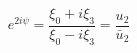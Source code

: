 \begin{equation}
e^{2i \psi} = \frac{\xi_{0} + i \xi_{3}}{\xi_{0} -i \xi_{3}}=\frac{u_{2}}{\bar{u}_{2}}
\end{equation}

